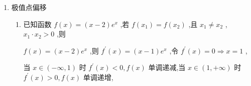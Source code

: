 \begin{enumerate}
\begin{enumerate}
\begin{jieda}
\begin{enumerate}
\begin{dingautolist}{172}
                    由 ${2a}\ln {x}_{1} + \dfrac{1}{2}{x}_{1}^{2} - \left( {a + 2}\right) {x}_{1} = 0$ ，则 ${x}_{1}^{2} - 4{x}_{1} = {2a}\left( {{x}_{1} - 2\ln {x}_{1}}\right)$
                    
                    令 $h\left( x\right)  = f\left( {4 - x}\right)  - f\left( x\right)$ ，且 $0 < x < 2$ ，
                    
                    则 $h\left( x\right)  = {2a}\ln \left( {4 - x}\right)  + \dfrac{1}{2}{\left( 4 - x\right) }^{2} - \left( {a + 2}\right) \left( {4 - x}\right)  - {2a}\ln x - \dfrac{1}{2}{x}^{2} + \left( {a + 2}\right) x$
                    
                    $= {2a}\ln \left( {4 - x}\right)  - {2a}\ln x - {4a} + {2ax}$ ,
                    
                    所以，在 $\left( {0,2}\right)$ 上 ${h}^{\prime }\left( x\right)  =  - {2a} \cdot  \dfrac{{\left( x - 2\right) }^{2}}{x\left( {4 - x}\right) } > 0$ ，即 $h\left( x\right)$ 在 $\left( {0,2}\right)$ 上递增，
                    
                    所以 $h\left( x\right)  < h\left( 2\right)  = {2a}\ln 2 - {2a}\ln 2 - {4a} + {4a} = 0$ ,即 $f\left( {4 - {x}_{1}}\right)  < f\left( {x}_{1}\right)  = f\left( {x}_{2}\right)$ 成立,
                    
                    所以 ${x}_{1} + {x}_{2} > 4$ ,得证.
                \end{dingautolist}
            \end{enumerate}
        \end{jieda}
    \end{enumerate}
    
    \item 极值点偏移
    \begin{enumerate}
        \item 已知函数 $f\left( x\right)  = \left( {x - 2}\right) {{e}}^{x}$ ,若 $f\left( {x}_{1}\right)  = f\left( {x}_{2}\right)$ ,且 ${x}_{1} \neq  {x}_{2}$ , ${x}_{1} \cdot  {x}_{2} > 0$ ,则
        \begin{jieda}
            $f\left( x\right)  = \left( {x - 2}\right) {{e}}^{x}$ ,则 ${f}^{\prime }\left( x\right)  = \left( {x - 1}\right) {{e}}^{x}$ ,令 ${f}^{\prime }\left( x\right)  = 0 \Longrightarrow  x = 1$ ,
            
            当 $x \in  \left( {-\infty ,1}\right)$ 时 ${f}^{\prime }\left( x\right)  < 0,f\left( x\right)$ 单调递减,当 $x \in  \left( {1, + \infty }\right)$ 时 ${f}^{\prime }\left( x\right)  > 0,f\left( x\right)$ 单调递增,
            

\end{jieda}
\end{enumerate}
\end{enumerate}
